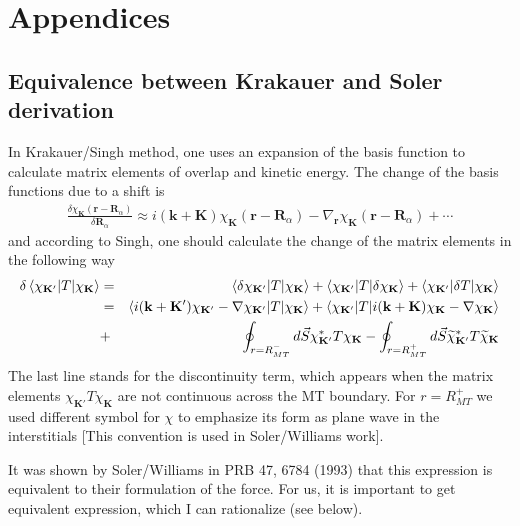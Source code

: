 \documentclass[aps,prb,floatfix,epsfig,singlecolumn,showpacs,preprintnumbers]{revtex4}
\newcommand{\vR}{{\mathbf{R}}}
\renewcommand{\vr}{{\mathbf{r}}}
\newcommand{\vk}{{\mathbf{k}}}
\newcommand{\vK}{{\mathbf{K}}}
\begin{document}
\section{Appendices}

\subsection{Equivalence between Krakauer and Soler derivation}

In Krakauer/Singh method, one uses an expansion of the basis function
to calculate matrix elements of overlap and kinetic energy.
The change of the basis functions due to a shift is
\begin{eqnarray}
\frac{\delta \chi_{\vK}(\vr-\vR_\alpha)}{\delta\vR_\alpha}\approx
  i(\vk+\vK)\chi_\vK(\vr-\vR_\alpha) - \nabla_\vr\chi_\vK(\vr-\vR_\alpha)+\cdots
\end{eqnarray}
and according to Singh, one should calculate the change of the matrix elements in the
following way
\begin{eqnarray}
\delta\braket{\chi_{\vK'}|T|\chi_{\vK}}&=&
\braket{\delta\chi_{\vK'}|T|\chi_{\vK}}
+\braket{\chi_{\vK'}|T|\delta\chi_{\vK}}
+\braket{\chi_{\vK'}|\delta T|\chi_{\vK}}\\
&=&
\braket{i(\vk+\vK')\chi_{\vK'}-\nabla\chi_{\vK'}|T|\chi_\vK}
+\braket{\chi_{\vK'}|T|i(\vk+\vK)\chi_{\vK}-\nabla\chi_{\vK}}\\
&+&\oint_{r=R_{MT}^-} d\vec{S}\chi^*_{\vK'} T \chi_{\vK}
-\oint_{r=R_{MT}^+} d\vec{S}\widetilde{\chi}^*_{\vK'} T \widetilde{\chi}_{\vK}
\end{eqnarray}
The last line stands for the discontinuity term, which appears when
the matrix elements $\chi_{\vK'}T\chi_{\vK}$ are not continuous
across the MT boundary.
For $r=R_{MT}^+$ we used different symbol for $\chi$ to emphasize its
form as plane wave in the interstitials [This convention is used in
Soler/Williams work].

It was shown by Soler/Williams in PRB 47, 6784 (1993) that this
expression is equivalent to their formulation of the force. For us, it
is important to get equivalent expression, which I can rationalize
(see below).
\end{document}
